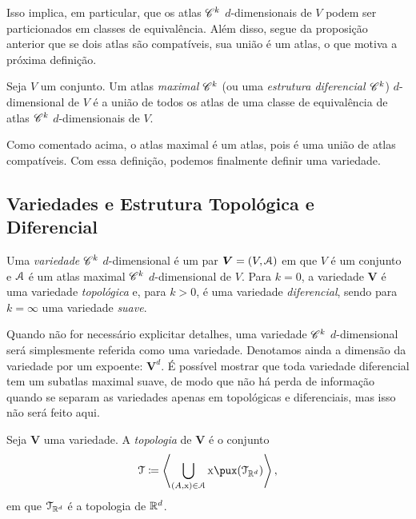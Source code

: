 Isso implica, em particular, que os atlas $\mathscr{C}^k$ $d$-dimensionais de $V$ podem ser particionados em classes de equivalência. Além disso, segue da proposição anterior que se dois atlas são compatíveis, sua união é um atlas, o que motiva a próxima definição.

\begin{defi}
Seja $V$ um conjunto. Um atlas \emph{maximal} $\mathscr{C}^k$ (ou uma \emph{estrutura diferencial $\mathscr{C}^k$}) $d$-dimensional de $V$ é a união de todos os atlas de uma classe de equivalência de atlas $\mathscr{C}^k$ $d$-dimensionais de $V$.
\end{defi}

Como comentado acima, o atlas maximal é um atlas, pois é uma união de atlas compatíveis. Com essa definição, podemos finalmente definir uma variedade.

\subsection{Variedades e Estrutura Topológica e Diferencial}

\begin{defi}
Uma \emph{variedade} $\mathscr{C}^k$ $d$-dimensional é um par $\bm V=(V,\mathcal{A})$ em que $V$ é um conjunto e $\mathcal{A}$ é um atlas maximal $\mathscr{C}^k$ $d$-dimensional de $V$. Para $k=0$, a variedade $\bm V$ é uma variedade \emph{topológica} e, para $k>0$, é uma variedade \emph{diferencial}, sendo para $k=\infty$ uma variedade \emph{suave}.
\end{defi}

Quando não for necessário explicitar detalhes, uma variedade $\mathscr{C}^k$ $d$-dimensional será simplesmente referida como uma variedade. Denotamos ainda a dimensão da variedade por um expoente: $\bm V^d$. É possível mostrar que toda variedade diferencial tem um subatlas maximal suave, de modo que não há perda de informação quando se separam as variedades apenas em topológicas e diferenciais, mas isso não será feito aqui.


\begin{defi}
Seja $\bm V$ uma variedade. A \emph{topologia} de $\bm V$ é o conjunto
	\begin{equation*}
	\topo \coloneqq  \ger{\bigcup_{(A,\x) \in \atlas} \x\pux(\topo_{\R^d})},
	\end{equation*}
em que $\mathcal{T}_{\mathbb{R}^d}$ é a topologia de $\mathbb{R}^d$.
\end{defi}

